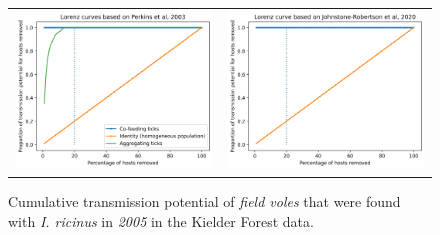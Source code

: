 \documentclass{article}
\begin{document}
\begin{figure}[h!]
	\centering
	\begin{tabular}{ll}
		\includegraphics[width=.48\linewidth,valign=m]{lorenz_perkins_FV_2005_I.Ricinus} & \includegraphics[width=.48\linewidth,valign=m]{lorenz_JR_FV_2005_I.Ricinus} \\
	\end{tabular}
	\caption{Cumulative transmission potential of \textit{field voles} that were found with \textit{I. ricinus} in \textit{2005} in the Kielder Forest data.}
	\label{fig:lorenz_2005_iricinus_FV}
\end{figure}
\end{document}
